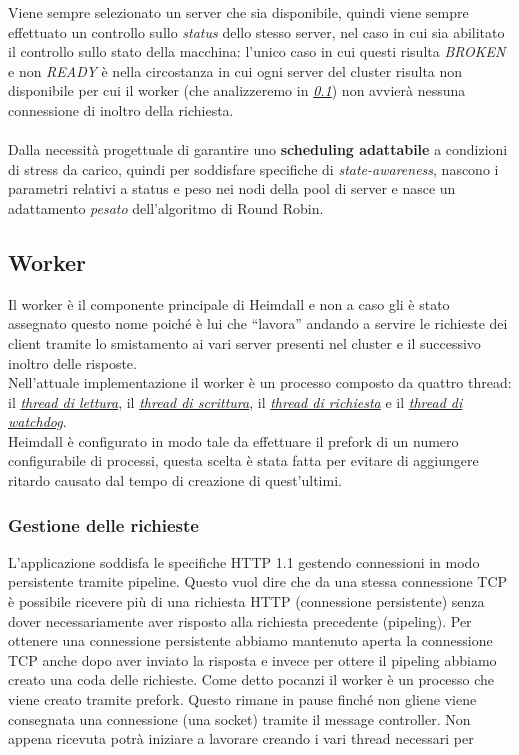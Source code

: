 \documentclass[italian]{tktltiki2}
\begin{document}
Viene sempre selezionato un server che sia disponibile, quindi viene sempre effettuato un controllo sullo \emph{status} dello stesso server, nel caso in cui sia abilitato il controllo sullo stato della macchina: l'unico caso in cui questi risulta \emph{BROKEN} e non \emph{READY} è nella circostanza in cui ogni server del cluster risulta non disponibile per cui il worker (che analizzeremo in \emph{\ref{ssec: worker}}) non avvierà nessuna connessione di inoltro della richiesta. \\\\
Dalla necessità progettuale di garantire uno \textbf{scheduling adattabile} a condizioni di stress da carico, quindi per soddisfare specifiche di \emph{state-awareness}, nascono i parametri relativi a status e peso nei nodi della pool di server e nasce un adattamento \emph{pesato} dell'algoritmo di Round Robin.



\subsection{Worker} \label{ssec: worker}
Il worker è il componente principale di Heimdall e non a caso gli è stato assegnato questo nome poiché è lui che ``lavora'' andando a servire le richieste dei client tramite lo smistamento ai vari server presenti nel cluster e il successivo inoltro delle risposte.
\\
Nell'attuale implementazione il worker è un processo composto da quattro thread: il \hyperref[sec:reader]{\emph{thread di lettura}}, il \hyperref[sec:writer]{\emph{thread di scrittura}}, il \hyperref[sec:request]{\emph{thread di richiesta}} e il \hyperref[sec:watchdog]{\emph{thread di watchdog}}.
\\
Heimdall è configurato in modo tale da effettuare il prefork di un numero configurabile di processi, questa scelta è stata fatta per evitare di aggiungere ritardo causato dal tempo di creazione di quest'ultimi.

\subsubsection{Gestione delle richieste}
L'applicazione soddisfa le specifiche HTTP 1.1 gestendo connessioni in modo persistente tramite pipeline. Questo vuol dire che da una stessa connessione TCP è possibile ricevere più di una richiesta HTTP (connessione persistente) senza dover necessariamente aver risposto alla richiesta precedente (pipeling). Per ottenere una connessione persistente abbiamo mantenuto aperta la connessione TCP anche dopo aver inviato la risposta e invece per ottere il pipeling abbiamo creato una coda delle richieste. 
Come detto pocanzi il worker è un processo che viene creato tramite prefork. Questo rimane in pause finché non gliene viene consegnata una connessione (una socket) tramite il message controller. Non appena ricevuta potrà iniziare a lavorare creando i vari thread necessari per 
\end{document}
